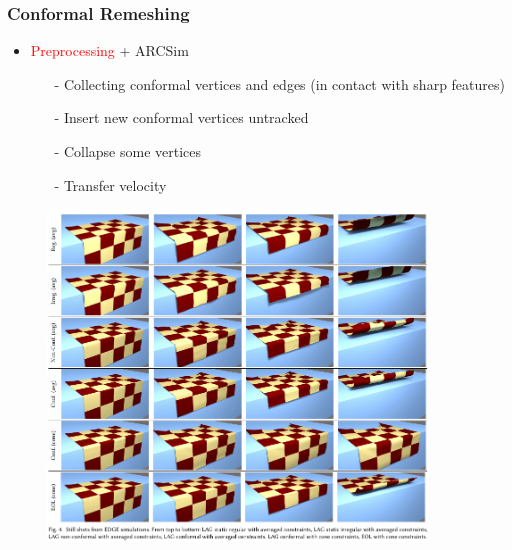 \documentclass[serif,mathserif, 12pt]{beamer}
\newcommand{\TODO}[1]{\textcolor{red}{#1}}
\begin{document}
\begin{frame}
  \frametitle{Conformal Remeshing}
  \begin{itemize}
  \item \TODO{Preprocessing} + ARCSim
    \begin{itemize}
    \item[-] Collecting conformal vertices and edges (in contact with sharp features)
    \item[-] Insert new conformal vertices untracked
    \item[-] Collapse some vertices
    \item[-] Transfer velocity
    \end{itemize}
  \end{itemize}
\end{frame}

\begin{frame}
\end{frame}

\begin{frame}
  \begin{figure}
    \centering
    \includegraphics[width=0.9\textwidth]{img/comparison}
  \end{figure}
\end{frame}
\end{document}
